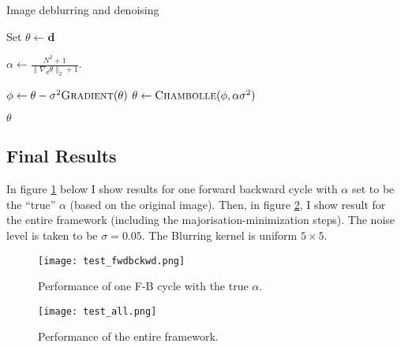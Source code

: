 \documentclass[paper=a4, fontsize=11pt]{scrartcl} %
\numberwithin{equation}{section} %
\numberwithin{figure}{section} %
\numberwithin{table}{section} %
\newcommand{\data}{\mathbf{d}}
\newcommand{\param}{\theta}
\newcommand{\paramm}{\phi}
\newcommand{\grad}{\nabla_{d} }
\begin{document}
\begin{algorithm}
  \caption{Image deblurring and denoising}
  \begin{algorithmic}[1]
    \State Set $\param \gets \data$     
     

    \State $\alpha \gets \frac{N^2+1}{\|\grad\param \|_2 + 1}$.

     
    \State $\paramm \gets \param - \sigma^2 \Call{Gradient}{\param}$ 
    \State $\param \gets \Call{Chambolle}{\paramm, \alpha\sigma^2}$ 
    \EndFor

    \EndFor
    \State \Return $\param$ 

  \end{algorithmic}
\end{algorithm}

\subsection{Final Results}
In figure \ref{fwdbckwd} below I show results for one forward backward
cycle with $\alpha$ set to be the ``true'' $\alpha$ (based on the
original image). Then, in figure \ref{all}, I show result for the
entire framework (including the majorisation-minimization steps). The
noise level is taken to be $\sigma = 0.05$. The Blurring kernel is
uniform $5 \times 5$.
 
\begin{figure}[ht!]
\centering
\texttt{[image: test\_fwdbckwd.png]}
\caption{Performance of one F-B cycle with the true $\alpha$. \label{fwdbckwd}}
\end{figure}


\begin{figure}[ht!]
\centering
\texttt{[image: test\_all.png]}
\caption{Performance of the entire framework. \label{all}}
\end{figure}



\end{document}
